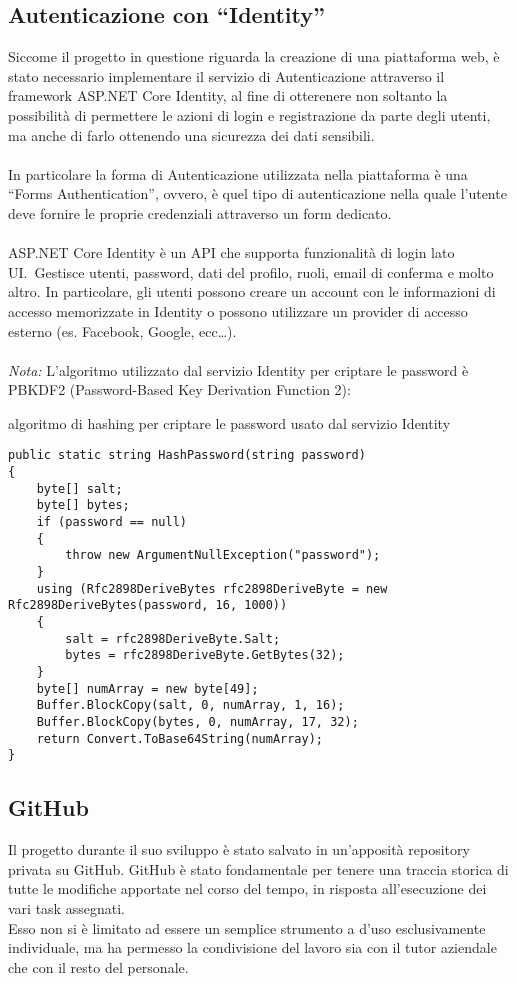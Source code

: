 \subsection{Autenticazione con ``Identity''}\label{sec:cap_sec_subsec}
Siccome il progetto in questione riguarda la creazione di una piattaforma web, è stato necessario
implementare il servizio di Autenticazione attraverso il framework ASP.NET Core Identity, al
fine di otterenere non soltanto la possibilità di permettere le azioni di login e registrazione da parte degli utenti, ma
anche di farlo ottenendo una sicurezza dei dati sensibili. 
\\ \\
In particolare la forma di Autenticazione utilizzata nella piattaforma è una ``Forms Authentication'', ovvero, è quel tipo di
autenticazione nella quale l'utente deve fornire le proprie credenziali attraverso un form dedicato. 
\\ \\
ASP.NET Core Identity è un API che supporta funzionalità di login lato UI.\ Gestisce utenti,
password, dati del profilo, ruoli, email di conferma e molto altro.
In particolare, gli utenti possono creare un account con le informazioni di accesso memorizzate in Identity 
o possono utilizzare un provider di accesso esterno (es. Facebook, Google, ecc\dots ).
\\ \\
\textit{Nota:} L'algoritmo utilizzato dal servizio Identity per criptare le password è PBKDF2 (Password-Based Key Derivation Function 2):
\begin{algorithm}[H]
	\caption{algoritmo di hashing per criptare le password usato dal servizio Identity}
	\label{lst:genic_mpi}
	\begin{lstlisting}[label=lst:test]
public static string HashPassword(string password)
{
    byte[] salt;
    byte[] bytes;
    if (password == null)
    {
        throw new ArgumentNullException("password");
    }
    using (Rfc2898DeriveBytes rfc2898DeriveByte = new Rfc2898DeriveBytes(password, 16, 1000))
    {
        salt = rfc2898DeriveByte.Salt;
        bytes = rfc2898DeriveByte.GetBytes(32);
    }
    byte[] numArray = new byte[49];
    Buffer.BlockCopy(salt, 0, numArray, 1, 16);
    Buffer.BlockCopy(bytes, 0, numArray, 17, 32);
    return Convert.ToBase64String(numArray);
}
    \end{lstlisting}
\end{algorithm}



\subsection{GitHub}\label{sec:cap_sec_subsec}
Il progetto durante il suo sviluppo è stato salvato in un'apposità repository privata
su GitHub.
GitHub è stato fondamentale per tenere una traccia storica di tutte le
modifiche apportate nel corso del tempo, in risposta all'esecuzione dei vari task assegnati. \\
Esso non si è limitato ad essere un semplice strumento a d'uso esclusivamente
individuale, ma ha permesso la condivisione del lavoro sia con il tutor 
aziendale che con il resto del personale.
